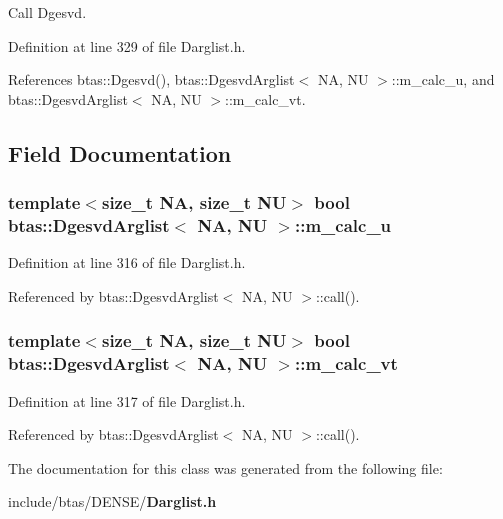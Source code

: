 Call Dgesvd. 



Definition at line 329 of file Darglist.\-h.



References btas\-::\-Dgesvd(), btas\-::\-Dgesvd\-Arglist$<$ N\-A, N\-U $>$\-::m\-\_\-calc\-\_\-u, and btas\-::\-Dgesvd\-Arglist$<$ N\-A, N\-U $>$\-::m\-\_\-calc\-\_\-vt.



\subsection{Field Documentation}
\subsubsection[{m\-\_\-calc\-\_\-u}]{\setlength{\rightskip}{0pt plus 5cm}template$<$size\-\_\-t N\-A, size\-\_\-t N\-U$>$ bool {\bf btas\-::\-Dgesvd\-Arglist}$<$ N\-A, N\-U $>$\-::m\-\_\-calc\-\_\-u\hspace{0.3cm}{\ttfamily [private]}}\label{d5/d3c/classbtas_1_1DgesvdArglist_aa9851f71dccca13f0a69255800c9c883}


Definition at line 316 of file Darglist.\-h.



Referenced by btas\-::\-Dgesvd\-Arglist$<$ N\-A, N\-U $>$\-::call().

\subsubsection[{m\-\_\-calc\-\_\-vt}]{\setlength{\rightskip}{0pt plus 5cm}template$<$size\-\_\-t N\-A, size\-\_\-t N\-U$>$ bool {\bf btas\-::\-Dgesvd\-Arglist}$<$ N\-A, N\-U $>$\-::m\-\_\-calc\-\_\-vt\hspace{0.3cm}{\ttfamily [private]}}\label{d5/d3c/classbtas_1_1DgesvdArglist_aee4abaa95b393b16ab07f4a2e9fedd0e}


Definition at line 317 of file Darglist.\-h.



Referenced by btas\-::\-Dgesvd\-Arglist$<$ N\-A, N\-U $>$\-::call().



The documentation for this class was generated from the following file\-:\begin{DoxyCompactItemize}
\item 
include/btas/\-D\-E\-N\-S\-E/{\bf Darglist.\-h}\end{DoxyCompactItemize}
